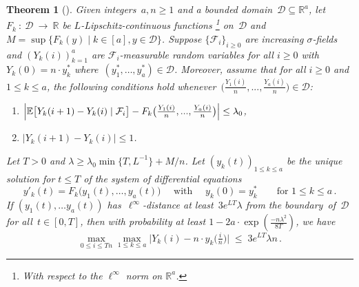 \documentclass[a4paper,12pt]{article}
\newtheorem{theorem}{Theorem}
\newcommand\bigpar[1]{\bigl(#1\bigr)}
\newcommand\bigabs[1]{\bigl|#1\bigr|}
\begin{document}
\begin{theorem}[\cite{warnke}]\label{thm:DEM}%
	Given integers~$a,n \ge 1$ and a bounded domain~$\mathcal{D} \subseteq \mathbb{R}^{a}$, let $F_k~:~\mathcal{D}~\to~\mathbb{R}$ be $L$-Lipschitz-continuous functions \footnote{With respect to the $\ell^{\infty}$ norm on $\mathbb{R}^a$.} on~$\mathcal{D}$ and $M=\sup\{F_k(y) \mid k \in [a], y \in \mathcal{D}\}$.
	Suppose $\{\mathcal{F}_i\}_{i \ge 0}$ are increasing $\sigma$-fields and
	$(Y_k(i))_{k=1}^{a}$ are $\mathcal{F}_i$-measurable random variables for all $i \ge 0$ with $Y_k(0)=n \cdot {y}_k^* $ where~$({y}_1^*, \ldots,  {y}_a^*) \in \mathcal{D}$. Moreover, assume that for all $i \geq 0$ and $1 \le k \le a$, the following conditions hold whenever~$\bigl(\frac{Y_1(i)}{n},...,\frac{Y_a(i)}{n}\bigr) \in \mathcal{D}$:
	\vspace{-0.25em}%
	\begin{enumerate}%
		\itemsep 0.125em \parskip 0em  \partopsep=0pt \parsep 0em
		\item[(i)]\label{dem:trend}%
		$\Bigl|\mathbb{E}\bigl[Y_k(i+1)-Y_k(i) \mid \mathcal{F}_{i}\bigr]-F_k\bigpar{\frac{Y_1(i)}{n},...,\frac{Y_a(i)}{n}} \Bigr| \le \lambda_0$,
		\item[(ii)]\label{dem:bounded}%
		$\bigabs{Y_k(i+1)-Y_k(i)}\le 1$. %
		 \end{enumerate}\vspace{-0.125em}%

	Let $T>0$ and $\lambda \ge \lambda_0 \min\{T,L^{-1}\} + M/n$. Let $(y_k(t))_{1 \le k \le a}$ be the unique solution for $t\le T$ of the system of differential equations
	\begin{equation}\label{dem:sol}
	y'_k(t) =F_k\bigpar{y_1(t), \ldots, y_a(t)} \quad \text{ with } \quad y_k(0) = {y}_k^* \qquad \text{for~$1 \le k \le a\,.$}
	\end{equation}
	 If $(y_1(t), \ldots y_a(t))$ has~$\ell^{\infty}$-distance at least~$3 e^{L T} \lambda$ from the boundary~of~$\mathcal{D}$ for all~$t \in [0,T]$, then
with probability at least $1-2a \cdot \exp(\frac{-n\lambda^2}{8T})$, we have
	\begin{equation}\label{dem:error}
	\max_{0 \le i \le T n} \max_{1 \le k \le a}\bigabs{Y_k(i)-n \cdot y_k\bigpar{\tfrac{i}{n}}} \; \leq \; 3 e^{L T} \lambda n \,.
	\end{equation}
\end{theorem}

\medskip
\end{document}
